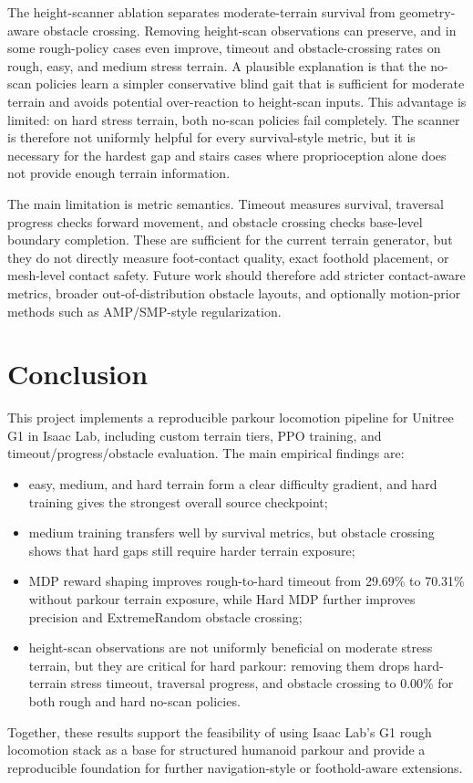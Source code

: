 \documentclass{article}
\begin{document}
The height-scanner ablation separates moderate-terrain survival from geometry-aware obstacle crossing. Removing height-scan observations can preserve, and in some rough-policy cases even improve, timeout and obstacle-crossing rates on rough, easy, and medium stress terrain. A plausible explanation is that the no-scan policies learn a simpler conservative blind gait that is sufficient for moderate terrain and avoids potential over-reaction to height-scan inputs. This advantage is limited: on hard stress terrain, both no-scan policies fail completely. The scanner is therefore not uniformly helpful for every survival-style metric, but it is necessary for the hardest gap and stairs cases where proprioception alone does not provide enough terrain information.

The main limitation is metric semantics. Timeout measures survival, traversal progress checks forward movement, and obstacle crossing checks base-level boundary completion. These are sufficient for the current terrain generator, but they do not directly measure foot-contact quality, exact foothold placement, or mesh-level contact safety. Future work should therefore add stricter contact-aware metrics, broader out-of-distribution obstacle layouts, and optionally motion-prior methods such as AMP/SMP-style regularization.

\section{Conclusion}
\label{sec:conclusion}

This project implements a reproducible parkour locomotion pipeline for Unitree G1 in Isaac Lab, including custom terrain tiers, PPO training, and timeout/progress/obstacle evaluation. The main empirical findings are:
\begin{itemize}[leftmargin=*,noitemsep,nolistsep,topsep=0pt]
    \item easy, medium, and hard terrain form a clear difficulty gradient, and hard training gives the strongest overall source checkpoint;
    \item medium training transfers well by survival metrics, but obstacle crossing shows that hard gaps still require harder terrain exposure;
    \item MDP reward shaping improves rough-to-hard timeout from 29.69\% to 70.31\% without parkour terrain exposure, while Hard MDP further improves precision and ExtremeRandom obstacle crossing;
    \item height-scan observations are not uniformly beneficial on moderate stress terrain, but they are critical for hard parkour: removing them drops hard-terrain stress timeout, traversal progress, and obstacle crossing to 0.00\% for both rough and hard no-scan policies.
\end{itemize}
Together, these results support the feasibility of using Isaac Lab's G1 rough locomotion stack as a base for structured humanoid parkour and provide a reproducible foundation for further navigation-style or foothold-aware extensions.
\end{document}
